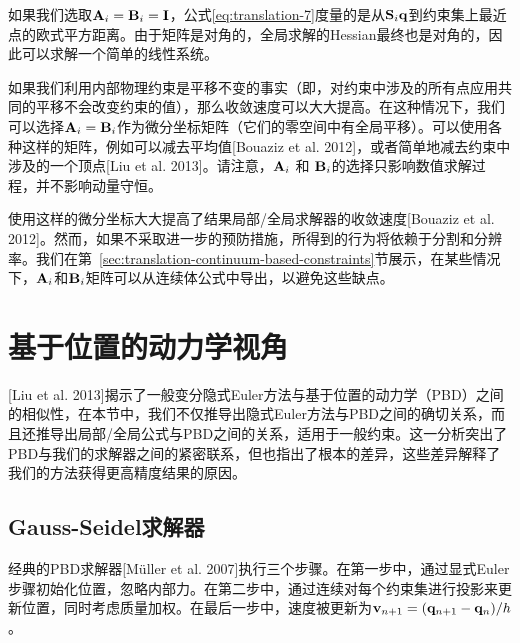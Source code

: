 \begin{translation}
如果我们选取$\vb{A}_i = \vb{B}_i = \vb{I}$，公式\eqref{eq:translation-7}度量的是从$\vb{S}_i \vb{q}$到约束集上最近点的欧式平方距离。由于矩阵是对角的，全局求解的Hessian最终也是对角的，因此可以求解一个简单的线性系统。

如果我们利用内部物理约束是平移不变的事实（即，对约束中涉及的所有点应用共同的平移不会改变约束的值），那么收敛速度可以大大提高。在这种情况下，我们可以选择$\vb{A}_i = \vb{B}_i$作为微分坐标矩阵（它们的零空间中有全局平移）。可以使用各种这样的矩阵，例如可以减去平均值[Bouaziz et al. 2012]，或者简单地减去约束中涉及的一个顶点[Liu et al. 2013]。请注意，$\vb{A}_i$ 和 $\vb{B}_i$的选择只影响数值求解过程，并不影响动量守恒。

使用这样的微分坐标大大提高了结果局部/全局求解器的收敛速度[Bouaziz et al. 2012]。然而，如果不采取进一步的预防措施，所得到的行为将依赖于分割和分辨率。我们在第~\ref{sec:translation-continuum-based-constraints}节展示，在某些情况下，$\vb{A}_i$和$\vb{B}_i$矩阵可以从连续体公式中导出，以避免这些缺点。

\section{基于位置的动力学视角}
\label{sec:translation-position-based-dynamics-view}[Liu et al. 2013]揭示了一般变分隐式Euler方法与基于位置的动力学（PBD）之间的相似性，在本节中，我们不仅推导出隐式Euler方法与PBD之间的确切关系，而且还推导出局部/全局公式与PBD之间的关系，适用于一般约束。这一分析突出了PBD与我们的求解器之间的紧密联系，但也指出了根本的差异，这些差异解释了我们的方法获得更高精度结果的原因。

\subsection{Gauss-Seidel求解器}
\label{sec:translation-gauss-seidel-solver}

经典的PBD求解器[Müller et al. 2007]执行三个步骤。在第一步中，通过显式Euler步骤初始化位置，忽略内部力。在第二步中，通过连续对每个约束集进行投影来更新位置，同时考虑质量加权。在最后一步中，速度被更新为$\vb{v}_{n + 1} = (\vb{q}_{n + 1} - \vb{q}_n) / h$。


\end{translation}
